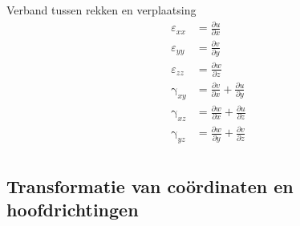             Verband tussen rekken en verplaatsing
            \begin{align}
                \varepsilon_{xx} &= \frac{\partial u}{\partial x} \nonumber\\
                \varepsilon_{yy} &= \frac{\partial v}{\partial y} \nonumber\\
                \varepsilon_{zz} &= \frac{\partial w}{\partial z} \nonumber\\
                \upgamma_{xy} &= \frac{\partial v}{\partial x} + \frac{\partial u}{\partial y} \nonumber\\
                \upgamma_{xz} &= \frac{\partial w}{\partial x} + \frac{\partial u}{\partial z} \nonumber\\
                \upgamma_{yz} &= \frac{\partial w}{\partial y} + \frac{\partial v}{\partial z} \nonumber\\
                \label{verband_rekken_verplaatsing}
            \end{align}

        \subsection{Transformatie van coördinaten en hoofdrichtingen}    

